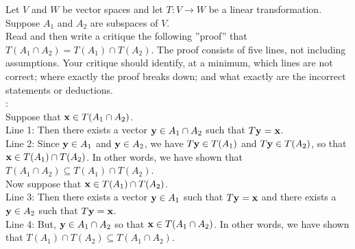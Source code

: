 \documentclass[10pt]{article}
\newcommand{\noin}{\noindent}
\begin{document}
\vspace{0.2in}
{\large 
{} 

\vspace{0.2in}


}

\vfill


\pagebreak


\noin{\bf 1.}  Let $V$ and $W$ be vector spaces and let $T:V\to W$ be a linear transformation. Suppose $A_1$ and $A_2$ are subspaces of $V$. \\

\noin Read and then write a critique the following ''proof'' that $T(A_1 \cap A_2) = T(A_1) \cap T(A_2)$.  The proof consists of five lines, not including assumptions.  Your critique should identify, at a minimum,  which lines are not correct; where exactly the proof breaks down; and what exactly are the incorrect statements or deductions. \\

\noin{\bf ''Proof''}:  \\

\noin Suppose that ${\bf x}\in T(A_1\cap A_2)$.  \\

\noin Line 1:  Then there exists a vector ${\bf y} \in A_1 \cap A_2$ such that $T{\bf y}={\bf x}$.  \\

\noin Line 2: Since ${\bf y}\in A_1$ and ${\bf y}\in A_2$, we have $T{\bf y} \in T(A_1)$ and $T{\bf y} \in T(A_2)$, so that ${\bf x}\in T(A_1)\cap T(A_2)$. In other words, we have shown that $T(A_1 \cap A_2) \subseteq T(A_1) \cap T(A_2)$.\\

\noin Now suppose that ${\bf x}\in T(A_1)\cap T(A_2)$.  \\

\noin Line 3:  Then there exists a vector ${\bf y}\in A_1$ such that $T{\bf y}={\bf x}$ and there exists a ${\bf y}\in A_2$ such that $T{\bf y}={\bf x}$.  \\

\noin Line 4: But, ${\bf y}\in A_1\cap A_2$ so that ${\bf x}\in T(A_1\cap A_2)$. In other words, we have shown that $ T(A_1) \cap T(A_2)\subseteq T(A_1 \cap A_2)$.\\
\end{document}

